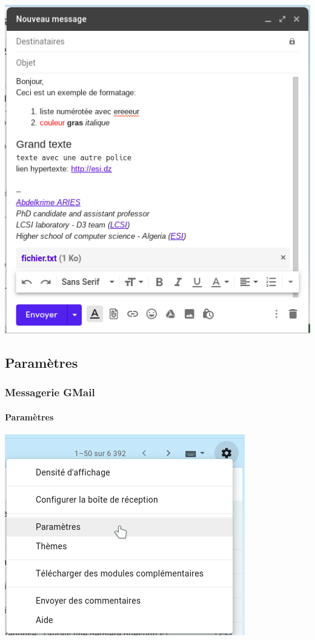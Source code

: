 \documentclass[xcolor=table]{beamer}
\begin{document}
\begin{frame}
\begin{minipage}{0.48\textwidth}
	\includegraphics[width=\textwidth]{..//img/Bweb02-ri-gmail/gmail-new.png}
\end{minipage}


\end{frame}

\subsection{Paramètres}

\begin{frame}
\frametitle{Messagerie GMail}
\framesubtitle{Paramètres}

\includegraphics[width=.60\textwidth]{..//img/Bweb02-ri-gmail/gmail-parametre.png}

\end{frame}
\end{document}
